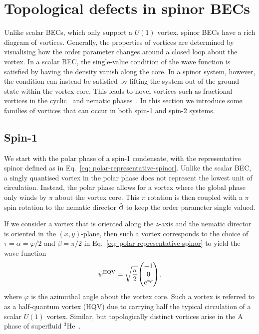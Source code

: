 \section{Topological defects in spinor BECs}
Unlike scalar BECs, which only support a \(U(1)\) vortex, spinor BECs have a
rich diagram of vortices.
Generally, the properties of vortices are determined by visualising how the
order parameter changes around a closed loop about the vortex.
In a scalar BEC, the single-value condition of the wave function is satisfied
by having the density vanish along the core.
In a spinor system, however, the condition can instead be satisfied by lifting
the system out of the ground state within the vortex core.
This leads to novel vortices such as fractional vortices in the
cyclic~\cite{Semenoff2007,Huhtamaki2009} and nematic
phases~\cite{Leonhardt2000, Seo2015}.
In this section we introduce some families of vortices that can occur
in both spin-1 and spin-2 systems.

\subsection{Spin-1}\label{sec: vortices-spin-1}
We start with the polar phase of a spin-1 condensate, with the representative
spinor defined as in Eq.~\eqref{eq: polar-representative-spinor}.
Unlike the scalar BEC, a singly quantised vortex in the polar phase does not
represent the lowest unit of circulation.
Instead, the polar phase allows for a vortex where the global phase only winds
by \(\pi \) about the vortex core.
This \(\pi \) rotation is then coupled with a \(\pi \) spin rotation to the
nematic director \(\hat{\vb{d}}\) to keep the order parameter single valued.

If we consider a vortex that is oriented along the \(z\)-axis and the nematic
director is oriented in the \((x, y)\)-plane, then such a vortex corresponds to
the choice of \(\tau=\alpha=\varphi/2 \) and \(\beta = \pi/2\) in
Eq.~\eqref{eq: polar-representative-spinor} to yield the wave function
\begin{equation}
    \psi^\mathrm{HQV} = \sqrt{\frac{n}{2}} \mqty(
    -1 \\
    0 \\
    e^{i\varphi}
    ),
    \label{eq: polar-HQV}
\end{equation}
where \(\varphi \) is the azimuthal angle about the vortex core.
Such a vortex is referred to as a half-quantum vortex (HQV) due to carrying
half the typical circulation of a scalar \(U(1)\) vortex.
Similar, but topologically distinct vortices arise in the A phase of
superfluid \( ^3\)He~\cite{Salomaa1985, Salomaa1987}.

